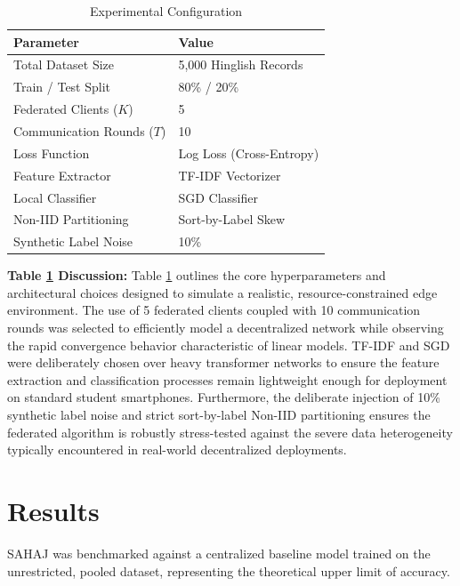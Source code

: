 \documentclass[conference]{IEEEtran}
\begin{document}
\begin{table}[htbp]
\caption{Experimental Configuration}
\label{tab:exp_config}
\begin{center}
\begin{tabular}{ll}
\toprule
\textbf{Parameter} & \textbf{Value} \\
\midrule
Total Dataset Size & 5,000 Hinglish Records \\
Train / Test Split & 80\% / 20\% \\
Federated Clients ($K$) & 5 \\
Communication Rounds ($T$) & 10 \\
Loss Function & Log Loss (Cross-Entropy) \\
Feature Extractor & TF-IDF Vectorizer \\
Local Classifier & SGD Classifier \\
Non-IID Partitioning & Sort-by-Label Skew \\
Synthetic Label Noise & 10\% \\
\bottomrule
\end{tabular}
\end{center}
\end{table}

\textbf{Table \ref{tab:exp_config} Discussion:} Table \ref{tab:exp_config} outlines the core hyperparameters and architectural choices designed to simulate a realistic, resource-constrained edge environment. The use of 5 federated clients coupled with 10 communication rounds was selected to efficiently model a decentralized network while observing the rapid convergence behavior characteristic of linear models. TF-IDF and SGD were deliberately chosen over heavy transformer networks to ensure the feature extraction and classification processes remain lightweight enough for deployment on standard student smartphones. Furthermore, the deliberate injection of 10\% synthetic label noise and strict sort-by-label Non-IID partitioning ensures the federated algorithm is robustly stress-tested against the severe data heterogeneity typically encountered in real-world decentralized deployments.

\section{Results}

SAHAJ was benchmarked against a centralized baseline model trained on the unrestricted, pooled dataset, representing the theoretical upper limit of accuracy. 
\end{document}
